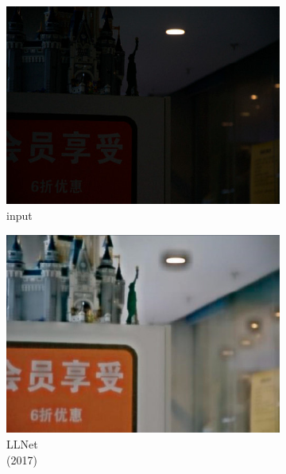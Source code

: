 \documentclass[a4paper, 10pt]{article}
\begin{document}
	\begin{figure}[htbp]
		\centering
		\begin{subfigure}{0.17\columnwidth}
			\includegraphics[width=\linewidth]{picture/LLIE/VE-LOL-L/input}
			\captionsetup{font=scriptsize}
			\caption*{input \\ \quad }
			\label{fig: input}
		\end{subfigure}
		\begin{subfigure}{0.17\columnwidth}
			\includegraphics[width=\linewidth]{picture/LLIE/VE-LOL-L/LLNet}
			\captionsetup{font=scriptsize}
			\caption*{LLNet \\ (2017)}
			\label{fig: LLNet_VE_LOL}	
		\end{subfigure}
		\begin{subfigure}{0.17\columnwidth}

\end{subfigure}
\end{figure}
\end{document}
